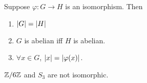 \begin{exercise*}
    Suppose $\varphi\colon G \to H$ is an isomorphism.
    Then
    \begin{enumerate}[label=(\arabic*)]
        \item $\abs{G} = \abs{H}$
        \item $G$ is abelian iff $H$ is abelian.
        \item $\forall x \in G$, $\abs{x} = \abs{\varphi(x)}$.
    \end{enumerate}
\end{exercise*}
\begin{corollary}
    $\mathbb{Z}/6\mathbb{Z}$ and $S_3$ are not isomorphic.
\end{corollary}
